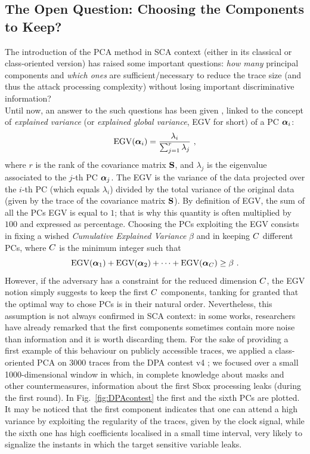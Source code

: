 \subsection{The Open Question: Choosing the Components to Keep?}\label{sec:ELV}
The introduction of the PCA method in SCA context (either in its classical or class-oriented version)  has raised some important questions: \textit{how many} principal components and \textit{which ones} are sufficient/necessary to reduce the trace size (and thus the attack processing complexity) without losing important discriminative information?\\

Until now, an answer to the such questions has been given \cite{choudary2014efficient}, linked to the concept of {\em explained variance} (or {\em explained global variance}, EGV for short) of a PC $\boldsymbol\alpha_i$:
\begin{equation}\label{eq:EGV}
\mathrm{EGV}(\boldsymbol\alpha_i) =  \frac{\lambda_i}{\sum_{j=1}^r\lambda_j} \mbox{ ,}
\end{equation}
where $r$ is the rank of the covariance matrix $\textbf{S}$, and $\lambda_j$ is the eigenvalue associated to the $j$-th PC $\boldsymbol\alpha_j$. The EGV is the variance of the data projected over the $i$-th PC (which equals $\lambda_i$) divided by the total variance of the original data (given by the trace of the covariance matrix $\textbf{S}$). By definition of EGV, the sum of all the PCs EGV is equal to $1$; that is why this quantity is often multiplied by $100$ and expressed as percentage.
Choosing the PCs exploiting the EGV consists in fixing a wished {\em Cumulative Explained Variance} $\beta$ and in keeping $C$ different PCs, where $C$ is the minimum integer such that
\begin{equation}
\mbox{EGV}(\boldsymbol\alpha_1) +\mbox{EGV}(\boldsymbol\alpha_2) + \dots +\mbox{EGV}(\boldsymbol\alpha_C) \geq \beta \mbox{ .}
\end{equation}
However, if the adversary has a constraint for the reduced dimension $C$, the EGV notion simply suggests to keep the first $C$ components, tanking for granted that the optimal way to chose PCs is in their natural order. Nevertheless, this assumption is not always confirmed in SCA context: in some works, researchers have already remarked that the first components sometimes contain more noise than information \cite{Batina2012,specht} and it is worth discarding them. For the sake of providing a first example of this behaviour on publicly accessible traces, we applied a class-oriented PCA on 3000 traces from the DPA contest v4 \cite{DPAcontest}; we focused over a small 1000-dimensional window in which, in complete knowledge about masks and other countermeasures, information about the first Sbox processing leaks (during the first round). In Fig.~\ref{fig:DPAcontest} the first and the sixth PCs are plotted. It may be noticed that the first component indicates that one can attend a high variance by exploiting the regularity of the traces, given by the clock signal, while the sixth one has high coefficients localised in a small time interval, very likely to signalize the instants in which the target sensitive variable leaks.

